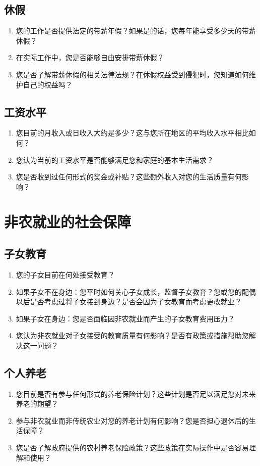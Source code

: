 \documentclass[12pt]{article}
\begin{document}
\subsection*{休假}
\begin{enumerate}
    \item 您的工作是否提供法定的带薪年假？如果是的话，您每年能享受多少天的带薪休假？
    \item 在实际工作中，您是否能够自由安排带薪休假？
    \item 您是否了解带薪休假的相关法律法规？在休假权益受到侵犯时，您知道如何维护自己的权益吗？
\end{enumerate}

\subsection*{工资水平}
\begin{enumerate}
    \item 您目前的月收入或日收入大约是多少？这与您所在地区的平均收入水平相比如何？
    \item 您认为当前的工资水平是否能够满足您和家庭的基本生活需求？
    \item 您是否收到过任何形式的奖金或补贴？这些额外收入对您的生活质量有何影响？
\end{enumerate}

\section{非农就业的社会保障}



\subsection*{子女教育}
\begin{enumerate}
    \item 您的子女目前在何处接受教育？
    \item 如果子女不在身边：您平时如何关心子女成长，监督子女教育？您或您的配偶以后是否考虑过将子女接到身边？是否会因为子女教育而考虑更改就业？
    \item 如果子女在身边：您是否面临因非农就业而产生的子女教育费用压力？
    \item 您认为非农就业对子女接受的教育质量有何影响？是否有政策或措施帮助您解决这一问题？
\end{enumerate}

\subsection*{个人养老}
\begin{enumerate}
    \item 您目前是否有参与任何形式的养老保险计划？这些计划是否足以满足您对未来养老的期望？
    \item 参与非农就业而非传统农业对您的养老计划有何影响？您是否担心退休后的生活保障？
    \item 您是否了解政府提供的农村养老保险政策？这些政策在实际操作中是否容易理解和使用？
\end{enumerate}
\end{document}
